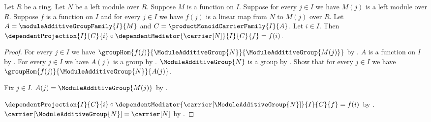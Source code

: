 \begin{theorem}\label{product_module_mediator_factorization}
    Let $R$ be a ring.
    Let $N$ be a left module over $R$.
    Suppose $M$ is a function on $I$.
    Suppose for every $j\in I$ we have $M(j)$ is a left module over $R$.
    Suppose $f$ is a function on $I$ and for every $j\in I$ we have
        $f(j)$ is a linear map from $N$ to $M(j)$ over $R$.
    Let $A=\moduleAdditiveGroupFamily{I}{M}$ and
        $C=\productMonoidCarrierFamily{I}{A}$.
    Let $i\in I$.
    Then
        $\dependentProjection{I}{C}{i}\circ
            \dependentMediator{\carrier[N]}{I}{C}{f}=f(i)$.
\end{theorem}
\begin{proof}
    For every $j\in I$ we have
        $\groupHom{f(j)}{\ModuleAdditiveGroup{N}}{
            \ModuleAdditiveGroup{M(j)}}$ by
        .
    $A$ is a function on $I$ by
        .
    For every $j\in I$ we have $A(j)$ is a group by
        .
    $\ModuleAdditiveGroup{N}$ is a group by
        .
    Show that for every $j\in I$ we have
        $\groupHom{f(j)}{\ModuleAdditiveGroup{N}}{A(j)}$.
    \begin{subproof}
        Fix $j\in I$.
        $A(j)=\ModuleAdditiveGroup{M(j)}$ by
            .
    \end{subproof}
    $\dependentProjection{I}{C}{i}\circ
        \dependentMediator{\carrier[\ModuleAdditiveGroup{N}]}{I}{C}{f}
        =f(i)$ by .
    $\carrier[\ModuleAdditiveGroup{N}]=\carrier[N]$ by
        .
\end{proof}

